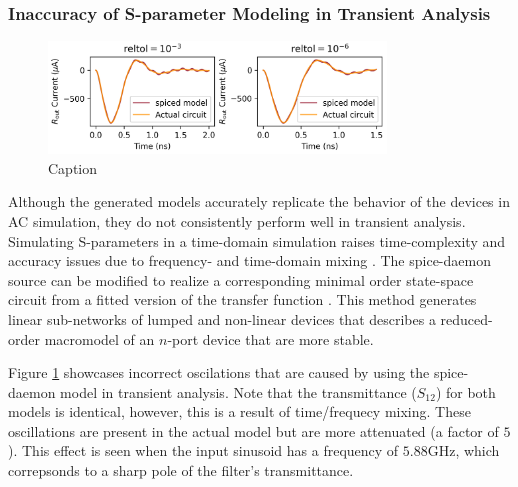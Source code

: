 \documentclass[]{article}
\begin{document}
\subsubsection{Inaccuracy of S-parameter Modeling in Transient Analysis}

\begin{figure}
    \centering
    \includegraphics[width=0.8\textwidth]{figs/td_LC_sad.png}
    \caption{Caption}
    \label{fig:td_sparam_sad}
\end{figure}

Although the generated models accurately replicate the behavior of the devices in 
AC simulation, they do not consistently perform well in transient analysis.
Simulating S-parameters in a time-domain simulation raises 
time-complexity and accuracy issues due to frequency- and time-domain 
mixing \cite{td-fd-mixing}.
The spice-daemon source can be modified to realize a corresponding 
minimal order state-space circuit from a fitted version of the transfer 
function \cite{arb-sparam-spice}.
This method generates linear sub-networks of lumped and non-linear devices
that describes a reduced-order macromodel of an $n$-port device that
are more stable.

Figure \ref{fig:td_sparam_sad} showcases incorrect oscilations that are caused by
using the spice-daemon model in transient analysis. Note that the transmittance ($S_{12}$)
for both models is identical, however, this is a result of time/frequecy mixing.
These oscillations are present in the actual model but are more attenuated (a factor
of $5$). This effect is seen when the input sinusoid has a frequency of $5.88$GHz,
which correpsonds to a sharp pole of the filter's transmittance.

\end{document}

